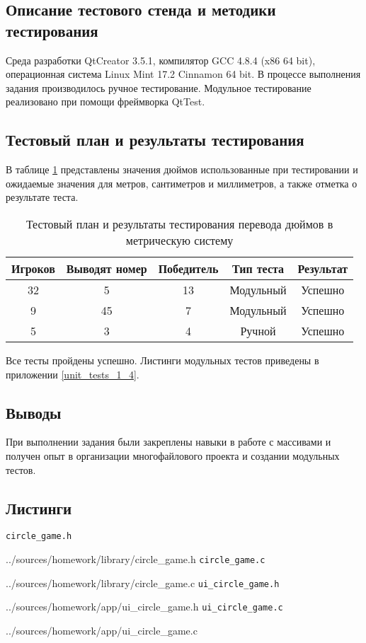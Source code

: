 \documentclass[12pt,a4paper]{report}
\begin{document}
\subsection{Описание тестового стенда и методики тестирования}
\hspace{\parindent}Среда разработки QtCreator 3.5.1, компилятор GCC 4.8.4 (x86 64 bit), операционная система Linux Mint 17.2 Cinnamon 64 bit.
В процессе выполнения задания производилось ручное тестирование.
Модульное тестирование реализовано при помощи фреймворка QtTest.

\subsection{Тестовый план и результаты тестирования}
\hspace{\parindent}В таблице \ref{inch_to_cm_test_plan} представлены значения дюймов использованные при тестировании и ожидаемые значения для метров, сантиметров и миллиметров, а также отметка о результате теста.
\FloatBarrier
\begin{table}[h]
\caption{Тестовый план и результаты тестирования перевода дюймов в метрическую систему}
\label{inch_to_cm_test_plan}
\begin{tabular}{| c c | c | c | c |}
\hline 
Игроков & Выводят номер & Победитель & Тип теста & Результат\\ 
\hline 
32 & 5 & 13 & Модульный & Успешно \\ 
\hline 
9 & 45 & 7 & Модульный & Успешно \\ 
\hline 
5 & 3 & 4 & Ручной & Успешно \\ 
\hline 
\end{tabular} 
\end{table}
\FloatBarrier
Все тесты пройдены успешно. Листинги модульных тестов приведены в приложении \ref{unit_tests_1_4}.
\subsection{Выводы}
\hspace{\parindent}При выполнении задания были закреплены навыки в работе с массивами и получен опыт в организации многофайлового проекта и создании модульных тестов.

\newpage
\subsection{Листинги}
\verb+circle_game.h+

{../sources/homework/library/circle_game.h}
\verb+circle_game.c+

{../sources/homework/library/circle_game.c}
\verb+ui_circle_game.h+

{../sources/homework/app/ui_circle_game.h}
\verb+ui_circle_game.c+

{../sources/homework/app/ui_circle_game.c}
\end{document}

